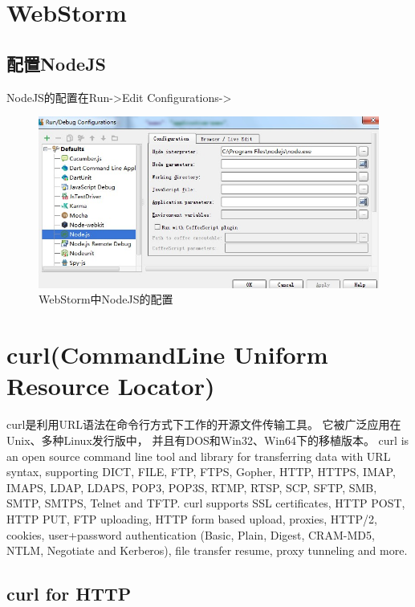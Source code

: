 \documentclass{book}
\begin{document}
\section{WebStorm}

\subsection{配置NodeJS}


NodeJS的配置在Run->Edit Configurations->

\begin{figure}[htbp]
	\centering
	\includegraphics[scale=0.8]{WebStormPackageNodeJSConfig.jpg}
	\caption{WebStorm中NodeJS的配置}
	\label{fig:WebStormPackageNodeJSConfig}
\end{figure}




\section{curl(CommandLine Uniform Resource Locator)}

curl是利用URL语法在命令行方式下工作的开源文件传输工具。
它被广泛应用在Unix、多种Linux发行版中，
并且有DOS和Win32、Win64下的移植版本。
curl is an open source command line tool and library for transferring data with URL syntax, 
supporting DICT, FILE, FTP, FTPS, Gopher, HTTP, HTTPS, IMAP, IMAPS, LDAP, LDAPS, POP3, 
POP3S, RTMP, RTSP, SCP, SFTP, SMB, SMTP, SMTPS, Telnet and TFTP. curl supports SSL certificates, 
HTTP POST, HTTP PUT, FTP uploading, HTTP form based upload, proxies, HTTP/2, cookies, 
user+password authentication (Basic, Plain, Digest, CRAM-MD5, NTLM, Negotiate and Kerberos), 
file transfer resume, proxy tunneling and more. 

\subsection{curl for HTTP}
\end{document}
